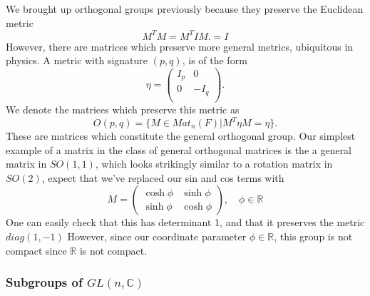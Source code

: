 We brought up orthogonal groups previously because they preserve the Euclidean metric
\[ 
	M^T M  = M^T I M. = I 
\] 
 However, there are matrices which preserve more general metrics, ubiquitous in physics. A metric with signature $(p, q)$, is of the form 
\[
	\eta = \begin{pmatrix}
		I_p & 0 \\
		0 & - I_q \\
	\end{pmatrix}. 
\]
We denote the matrices which preserve this metric as 
\[
	O(p, q) = \{ M \in Mat_n(F) | M^T \eta M = \eta  \} . 
\]
These are matrices which constitute the general orthogonal group. Our simplest example of a matrix in the class of general orthogonal matrices is the a general matrix in $SO(1,1)$, which looks strikingly similar to a rotation matrix in $SO(2)$, expect that we've replaced our sin and cos terms with 
\[ 	
	M  = \begin{pmatrix} 
		\cosh \phi & \sinh \phi \\
		\sinh \phi & \cosh \phi 
	\end{pmatrix}, \quad \phi \in \mathbb{R} 
\] 
One can easily check that this has determinant 1, and that it preserves the metric $diag ( 1, - 1)$ However, since our coordinate parameter $\phi \in \mathbb{R} $, this group is not compact since $\mathbb{R}$ is not compact. 


\subsubsection{Subgroups of $GL(n, \mathbb{ C}) $}

